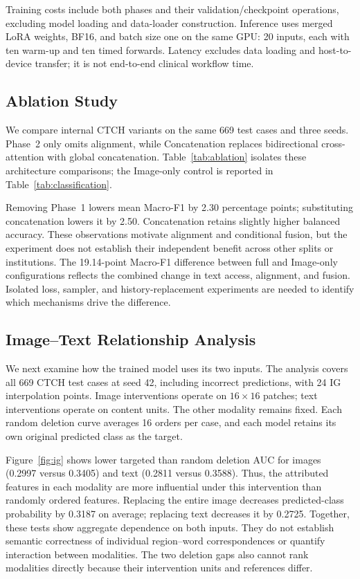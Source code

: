 \documentclass[conference,a4paper]{IEEEtran}
\begin{document}
Training costs include both phases and their validation/checkpoint operations, excluding model loading and data-loader construction. Inference uses merged LoRA weights, BF16, and batch size one on the same GPU: 20 inputs, each with ten warm-up and ten timed forwards. Latency excludes data loading and host-to-device transfer; it is not end-to-end clinical workflow time.

\subsection{Ablation Study}
We compare internal CTCH variants on the same 669 test cases and three seeds. Phase~2 only omits alignment, while Concatenation replaces bidirectional cross-attention with global concatenation. Table~\ref{tab:ablation} isolates these architecture comparisons; the Image-only control is reported in Table~\ref{tab:classification}.



Removing Phase~1 lowers mean Macro-F1 by 2.30 percentage points; substituting concatenation lowers it by 2.50. Concatenation retains slightly higher balanced accuracy. These observations motivate alignment and conditional fusion, but the experiment does not establish their independent benefit across other splits or institutions. The 19.14-point Macro-F1 difference between full and Image-only configurations reflects the combined change in text access, alignment, and fusion. Isolated loss, sampler, and history-replacement experiments are needed to identify which mechanisms drive the difference.

\subsection{Image--Text Relationship Analysis}
We next examine how the trained model uses its two inputs. The analysis covers all 669 CTCH test cases at seed 42, including incorrect predictions, with 24 IG interpolation points. Image interventions operate on $16\times16$ patches; text interventions operate on content units. The other modality remains fixed. Each random deletion curve averages 16 orders per case, and each model retains its own original predicted class as the target.

Figure~\ref{fig:ig} shows lower targeted than random deletion AUC for images (0.2997 versus 0.3405) and text (0.2811 versus 0.3588). Thus, the attributed features in each modality are more influential under this intervention than randomly ordered features. Replacing the entire image decreases predicted-class probability by 0.3187 on average; replacing text decreases it by 0.2725. Together, these tests show aggregate dependence on both inputs. They do not establish semantic correctness of individual region--word correspondences or quantify interaction between modalities. The two deletion gaps also cannot rank modalities directly because their intervention units and references differ.
\end{document}
